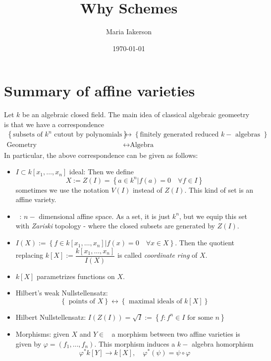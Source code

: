 \documentclass[12pt]{article} %
\title{Why Schemes} %
\author{Maria Iakerson} %
\date{\today} %
\DeclareMathOperator{\Aff}{\mathbb{A}^n}
\begin{document}
\maketitle %
\section{Summary of affine varieties}
Let $k$ be an algebraic closed field. The main idea of classical algebraic geomeetry is that we
have a correspondence
\begin{align*}
    \left\lbrace\text{subsets of $k^n$ cut} \text{out by polynomials} \right\rbrace & \leftrightarrow
    \left\lbrace \text{finitely generated reduced
    $k-$ algebras }\right\rbrace                                                                                     \\
    \text{Geometry}                                                                 & \leftrightarrow \text{Algebra}
\end{align*}
In particular, the above correspondence can be given as follows:
\begin{itemize}
    \item $I \subset k[x_1,\ldots,x_n]$ ideal: Then we define \[X:=Z(I) = \left\lbrace a \in k^n| f(a) =0 \quad\forall f \in I\right\rbrace\]
          sometimes we use the notation $V(I)$ instead of $Z(I)$. This kind of set is an affine variety.
    \item $\Aff$: $n-$ dimensional affine space. As a set, it is just $k^n$, but we equip this set with
          \textit{Zariski} topology - where the closed subsets are generated by $Z(I)$.
    \item $I(X):=\left\lbrace f \in k[x_1,\ldots,x_n]| f(x) =0 \quad \forall x \in X\right\rbrace$. Then the quotient replacing
          $k[X]:= \dfrac{k[x_1,\ldots,x_n]}{I(X)}$ is called \textit{coordinate ring} of $X$.
    \item $k[X]$ parametrizes functions on $X$.
    \item Hilbert's weak Nullstellensatz:
          \[\left\lbrace\text{ points of } X\right\rbrace \leftrightarrow \left\lbrace \text{ maximal ideals of }k[X]\right\rbrace\]
    \item Hilbert Nullstellensatz: $I(Z(I))=\sqrt{I}:=\left\lbrace f: f^n \in I \text{ for some } n\right\rbrace$
    \item Morphisms: given $X$ and $Y \in \Aff$ a morphism between two affine varieties is given by
          $\varphi=(f_1,\ldots,f_n)$. This morphism induces a $k-$ algebra homorphism
          \[\varphi^* k[Y] \to k[X],\quad \varphi^*(\psi) = \psi \circ \varphi\]
\end{itemize}
\end{document}
